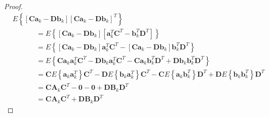 
\begin{proof}
\begin{equation*}
    \begin{aligned}
        &E \left\{ \left[ \mathbf{C} \mathbf{a}_k - \mathbf{D} \mathbf{b}_k \right] \left[ \mathbf{C} \mathbf{a}_k - \mathbf{D} \mathbf{b}_k \right]^T \right\} \\
        & \phantom{XXXX} = E \left\{ \left[ \mathbf{C} \mathbf{a}_k - \mathbf{D} \mathbf{b}_k \right] \left[ \mathbf{a}_k^T \mathbf{C}^T - \mathbf{b}_k^T \mathbf{D}^T \right] \right\} \\
        & \phantom{XXXX} = E \left\{ \left[ \mathbf{C} \mathbf{a}_k - \mathbf{D} \mathbf{b}_k \right] \mathbf{a}_k^T \mathbf{C}^T
        - \left[ \mathbf{C} \mathbf{a}_k - \mathbf{D} \mathbf{b}_k \right] \mathbf{b}_k^T \mathbf{D}^T \right\} \\
        & \phantom{XXXX} = E \left\{ \mathbf{C} \mathbf{a}_k \mathbf{a}_k^T \mathbf{C}^T - \mathbf{D} \mathbf{b}_k \mathbf{a}_k^T \mathbf{C}^T
        - \mathbf{C} \mathbf{a}_k \mathbf{b}_k^T \mathbf{D}^T + \mathbf{D} \mathbf{b}_k \mathbf{b}_k^T \mathbf{D}^T \right\} \\
        & \phantom{XXXX} = \mathbf{C} E \left\{ \mathbf{a}_k \mathbf{a}_k^T \right\} \mathbf{C}^T - \mathbf{D} E \left\{ \mathbf{b}_k \mathbf{a}_k^T \right\} \mathbf{C}^T
        - \mathbf{C} E \left\{ \mathbf{a}_k \mathbf{b}_k^T \right\} \mathbf{D}^T + \mathbf{D} E \left\{ \mathbf{b}_k \mathbf{b}_k^T \right\} \mathbf{D}^T \\
        & \phantom{XXXX} = \mathbf{C} \mathbf{A}_k \mathbf{C}^T - \mathbf{0} - \mathbf{0} + \mathbf{D} \mathbf{B}_k \mathbf{D}^T \\
        & \phantom{XXXX} = \mathbf{C} \mathbf{A}_k \mathbf{C}^T + \mathbf{D} \mathbf{B}_k \mathbf{D}^T
    \end{aligned}
\end{equation*}
\end{proof}

